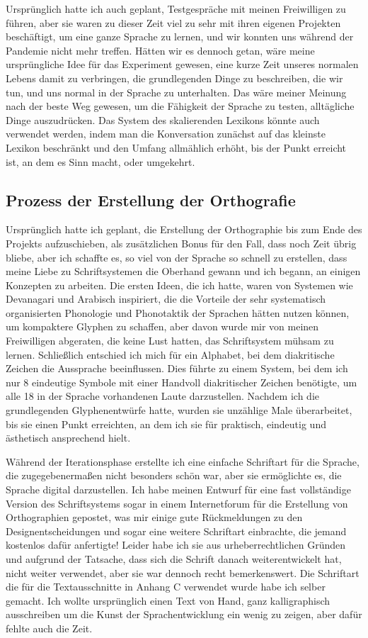\documentclass{article}
\begin{document}
Ursprünglich hatte ich auch geplant, Testgespräche mit meinen Freiwilligen zu führen,
aber sie waren zu dieser Zeit viel zu sehr mit ihren eigenen Projekten beschäftigt, um eine ganze Sprache zu lernen,
und wir konnten uns während der Pandemie nicht mehr treffen. Hätten wir es dennoch getan, wäre meine ursprüngliche
Idee für das Experiment gewesen, eine kurze Zeit unseres normalen Lebens damit zu verbringen,
die grundlegenden Dinge zu beschreiben, die wir tun, und uns normal in der Sprache zu unterhalten.
Das wäre meiner Meinung nach der beste Weg gewesen, um die Fähigkeit der Sprache zu testen, alltägliche Dinge auszudrücken.
Das System des skalierenden Lexikons könnte auch verwendet werden, indem man die Konversation zunächst auf das kleinste
Lexikon beschränkt und den Umfang allmählich erhöht, bis der Punkt erreicht ist, an dem es Sinn macht, oder umgekehrt.

\subsection{Prozess der Erstellung der Orthografie}
Ursprünglich hatte ich geplant, die Erstellung der Orthographie bis zum Ende des Projekts aufzuschieben,
als zusätzlichen Bonus für den Fall, dass noch Zeit übrig bliebe, aber ich schaffte es,
so viel von der Sprache so schnell zu erstellen, dass meine Liebe zu Schriftsystemen die Oberhand gewann und ich begann,
an einigen Konzepten zu arbeiten. Die ersten Ideen, die ich hatte, waren von Systemen wie Devanagari und Arabisch inspiriert,
die die Vorteile der sehr systematisch organisierten Phonologie und Phonotaktik der Sprachen hätten nutzen können,
um kompaktere Glyphen zu schaffen, aber davon wurde mir von meinen Freiwilligen abgeraten, die keine Lust hatten,
das Schriftsystem mühsam zu lernen. Schließlich entschied ich mich für ein Alphabet, bei dem diakritische Zeichen
die Aussprache beeinflussen. Dies führte zu einem System, bei dem ich nur 8 eindeutige Symbole mit einer Handvoll
diakritischer Zeichen benötigte, um alle 18 in der Sprache vorhandenen Laute darzustellen. Nachdem ich die grundlegenden
Glyphenentwürfe hatte, wurden sie unzählige Male überarbeitet, bis sie einen Punkt erreichten, an dem ich sie für praktisch,
eindeutig und ästhetisch ansprechend hielt.

Während der Iterationsphase erstellte ich eine einfache Schriftart für die Sprache,
die zugegebenermaßen nicht besonders schön war, aber sie ermöglichte es, die Sprache digital darzustellen.
Ich habe meinen Entwurf für eine fast vollständige Version des Schriftsystems sogar in einem Internetforum
für die Erstellung von Orthographien gepostet, was mir einige gute Rückmeldungen zu den Designentscheidungen
und sogar eine weitere Schriftart einbrachte, die jemand kostenlos dafür anfertigte! Leider habe ich sie aus
urheberrechtlichen Gründen und aufgrund der Tatsache, dass sich die Schrift danach weiterentwickelt hat,
nicht weiter verwendet, aber sie war dennoch recht bemerkenswert. Die Schriftart die für die Textausschnitte
in Anhang C verwendet wurde habe ich selber gemacht. Ich wollte ursprünglich einen Text von Hand, ganz
kalligraphisch ausschreiben um die Kunst der Sprachentwicklung ein wenig zu zeigen, aber dafür fehlte auch die Zeit.
\end{document}
